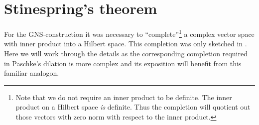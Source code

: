 \documentclass[b]{subfiles}
\begin{document}
\section{Stinespring's theorem}
\begin{parsec}%
\begin{point}%
For the GNS-construction
it was necessary to ``complete''\footnote{Note that
        we do not require an inner product to be definite.
    The inner product on a Hilbert space \emph{is} definite.
    Thus the completion will quotient out those vectors with
        zero norm with respect to the inner product.}
    a complex vector space with inner product into a Hilbert space.
This completion was only sketched in .
Here we will work through the details
    as the corresponding completion required
    in Paschke's dilation
    is more complex and its exposition will benefit
    from this familiar analogon.
\end{point}


\end{parsec}
\end{document}
